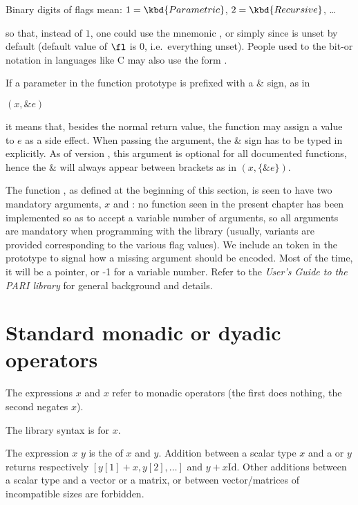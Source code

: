 \centerline{Binary digits of flags mean: $1=\kbd{Parametric}$,
$2=\kbd{Recursive}$, \dots}

\noindent so that, instead of $1$, one could use the mnemonic
, or simply  since
 is unset by default (default value of $\fl$ is $0$,
i.e.~everything unset). People used to the bit-or notation in languages like
C may also use the form .

  If a parameter in the function
prototype is prefixed with a \& sign, as in

$(x,\&e)$

\noindent it means that, besides the normal return value, the function may
assign a value to $e$ as a side effect. When passing the argument, the \&
sign has to be typed in explicitly. As of version \vers, this 
argument is optional for all documented functions, hence the \& will always
appear between brackets as in $(x,\{\&e\})$.

The  function , as defined at the beginning of this
section, is seen to have two mandatory arguments, $x$ and \fl: no function
seen in the present chapter has been implemented so as to accept a variable
number of arguments, so all arguments are mandatory when programming with the
library (usually, variants are provided corresponding to the various flag values).
We include an  token in the prototype to signal how a missing
argument should be encoded. Most of the time, it will be a  pointer, or
-1 for a variable number. Refer to the \emph{User's Guide to the PARI library}
for general background and details.

\section{Standard monadic or dyadic operators}

\subseckbd{+$/$-} The expressions \kbd{+}$x$ and \kbd{-}$x$ refer
to monadic operators (the first does nothing, the second negates $x$).

The library syntax is  for \kbd{-}$x$.

\subseckbd{+} The expression $x$ \kbd{+} $y$ is the  of $x$ and $y$.
Addition between a scalar type $x$ and a  or  $y$ returns
respectively $[y[1] + x, y[2],\dots]$ and $y + x \text{Id}$. Other additions
between a scalar type and a vector or a matrix, or between vector/matrices of
incompatible sizes are forbidden.

